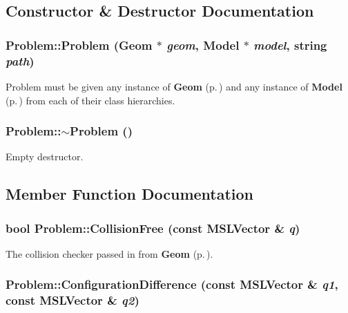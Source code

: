 \subsection{Constructor \& Destructor Documentation}
\subsubsection{\setlength{\rightskip}{0pt plus 5cm}Problem::Problem ({\bf Geom} $\ast$ {\em geom}, {\bf Model} $\ast$ {\em model}, string {\em path})}\label{class_Problem_a0}


Problem must be given any instance of {\bf Geom} {\rm (p.\,\pageref{class_Geom})} and any instance of {\bf Model} {\rm (p.\,\pageref{class_Model})} from each of their class hierarchies.

\subsubsection{\setlength{\rightskip}{0pt plus 5cm}Problem::$\sim$Problem ()\hspace{0.3cm}{\tt  [inline, virtual]}}\label{class_Problem_a1}


Empty destructor.



\subsection{Member Function Documentation}
\subsubsection{\setlength{\rightskip}{0pt plus 5cm}bool Problem::Collision\-Free (const {\bf MSLVector} \& {\em q})\hspace{0.3cm}{\tt  [virtual]}}\label{class_Problem_a12}


The collision checker passed in from {\bf Geom} {\rm (p.\,\pageref{class_Geom})}.

\subsubsection{ Problem::Configuration\-Difference (const {\bf MSLVector} \& {\em q1}, const {\bf MSLVector} \& {\em q2})\hspace{0.3cm}{\tt  [virtual]}}\label{class_Problem_a14}


